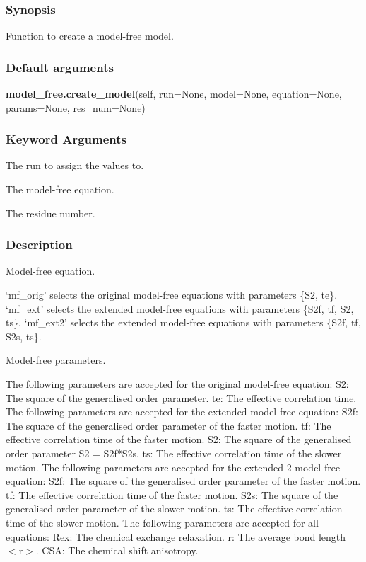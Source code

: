 \subsubsection{Synopsis}

Function to create a model-free model.

\subsubsection{Default arguments}

\textsf{\textbf{model\_free.create\_model}(self, run=None, model=None, equation=None, params=None, res\_num=None)}


\subsubsection{Keyword Arguments}

  The run to assign the values to.

  The model-free equation.

  The residue number.

\subsubsection{Description}

Model-free equation.

`mf\_orig' selects the original model-free equations with parameters \{S2, te\}.
`mf\_ext' selects the extended model-free equations with parameters \{S2f, tf, S2, ts\}.
`mf\_ext2' selects the extended model-free equations with parameters \{S2f, tf, S2s, ts\}.


Model-free parameters.

The following parameters are accepted for the original model-free equation:
    S2:     The square of the generalised order parameter.
    te:     The effective correlation time.
The following parameters are accepted for the extended model-free equation:
    S2f:    The square of the generalised order parameter of the faster motion.
    tf:     The effective correlation time of the faster motion.
    S2:     The square of the generalised order parameter S2 = S2f*S2s.
    ts:     The effective correlation time of the slower motion.
The following parameters are accepted for the extended 2 model-free equation:
    S2f:    The square of the generalised order parameter of the faster motion.
    tf:     The effective correlation time of the faster motion.
    S2s:    The square of the generalised order parameter of the slower motion.
    ts:     The effective correlation time of the slower motion.
The following parameters are accepted for all equations:
    Rex:    The chemical exchange relaxation.
    r:      The average bond length $<$r$>$.
    CSA:    The chemical shift anisotropy.



